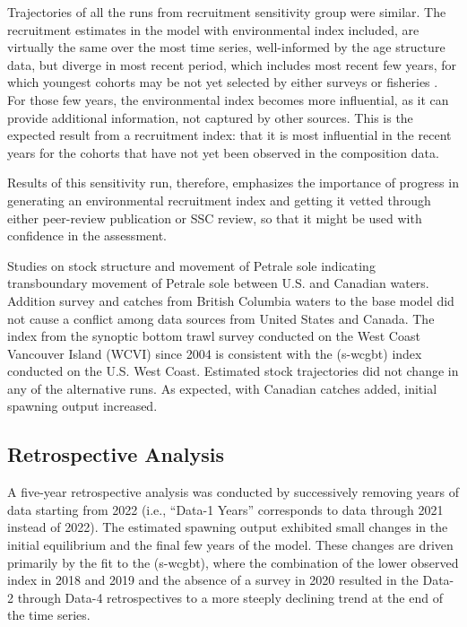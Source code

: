 \documentclass[
]{scrartcl}
\begin{document}
Trajectories of all the runs from recruitment sensitivity group were
similar. The recruitment estimates in the model with environmental index
included, are virtually the same over the most time series,
well-informed by the age structure data, but diverge in most recent
period, which includes most recent few years, for which youngest cohorts
may be not yet selected by either surveys or fisheries . For those few
years, the environmental index becomes more influential, as it can
provide additional information, not captured by other sources. This is
the expected result from a recruitment index: that it is most
influential in the recent years for the cohorts that have not yet been
observed in the composition data.

Results of this sensitivity run, therefore, emphasizes the importance of
progress in generating an environmental recruitment index and getting it
vetted through either peer-review publication or SSC review, so that it
might be used with confidence in the assessment.

Studies on stock structure and movement of Petrale sole indicating
transboundary movement of Petrale sole between U.S. and Canadian waters.
Addition survey and catches from British Columbia waters to the base
model did not cause a conflict among data sources from United States and
Canada. The index from the synoptic bottom trawl survey conducted on the
West Coast Vancouver Island (WCVI) since 2004 is consistent with the
(\textsf{s-wcgbt}) index conducted on the U.S. West Coast. Estimated stock
trajectories did not change in any of the alternative runs. As expected,
with Canadian catches added, initial spawning output increased.

\subsection{Retrospective Analysis}\label{retrospective-analysis}

A five-year retrospective analysis was conducted by successively
removing years of data starting from 2022 (i.e., ``Data-1 Years''
corresponds to data through 2021 instead of 2022). The estimated
spawning output exhibited small changes in the initial equilibrium and
the final few years of the model. These changes are driven primarily by
the fit to the (\textsf{s-wcgbt}), where the combination of the lower observed
index in 2018 and 2019 and the absence of a survey in 2020 resulted in
the Data-2 through Data-4 retrospectives to a more steeply declining
trend at the end of the time series.
\end{document}

